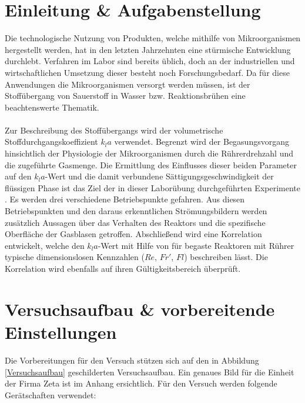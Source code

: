 \documentclass[12pt,liststotoc]{report}
\begin{document}
\chapter{Einleitung \& Aufgabenstellung}

Die technologische Nutzung von Produkten, welche mithilfe von Mikroorganismen hergestellt werden, hat in den letzten Jahrzehnten eine stürmische Entwicklung durchlebt. Verfahren im Labor sind bereits üblich, doch an der industriellen und  wirtschaftlichen Umsetzung dieser besteht noch Forschungsbedarf. Da für diese Anwendungen die Mikroorganismen versorgt werden müssen, ist der Stoffübergang von Sauerstoff in Wasser bzw. Reaktionsbrühen eine beachtenswerte Thematik. \cite{storhas2013bioverfahrensentwicklung}
\\
\\
Zur Beschreibung des Stoffübergangs wird der volumetrische Stoffdurchgangskoeffizient $k_la$ verwendet. Begrenzt wird der Begasungsvorgang hinsichtlich der Physiologie der Mikroorganismen durch die Rührerdrehzahl und die zugeführte Gasmenge. Die Ermittlung des Einflusses dieser beiden Parameter auf den $k_la$-Wert und die damit verbundene Sättigungsgeschwindigkeit der flüssigen Phase ist das Ziel der in dieser Laborübung durchgeführten Experimente \cite{Labor_Skript}. Es werden drei verschiedene Betriebspunkte gefahren. Aus diesen Betriebspunkten und den daraus erkenntlichen Strömungsbildern werden zusätzlich Aussagen über das Verhalten des Reaktors und die spezifische Oberfläche der Gasblasen getroffen. Abschließend wird eine Korrelation entwickelt, welche den $k_la$-Wert mit Hilfe von für begaste Reaktoren mit Rührer typische dimensionslosen Kennzahlen ($Re$, $Fr'$, $Fl$) beschreiben lässt. Die Korrelation wird ebenfalls auf ihren Gültigkeitsbereich überprüft. 


\chapter{Versuchsaufbau \& vorbereitende Einstellungen}

Die Vorbereitungen für den Versuch stützen sich auf den in Abbildung \ref{Versuchsaufbau} geschilderten Versuchsaufbau. Ein genaues Bild für die Einheit der Firma Zeta ist im Anhang ersichtlich. Für den Versuch werden folgende Gerätschaften verwendet:
\end{document}
